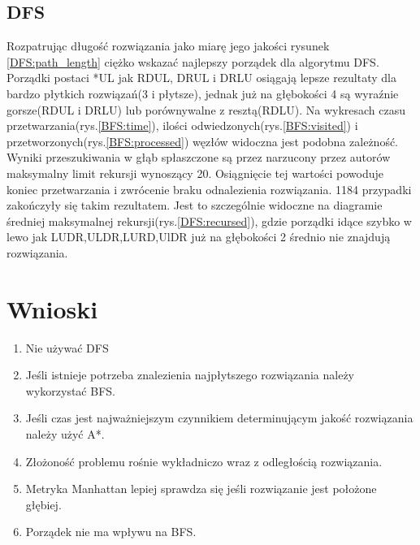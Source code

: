 \documentclass{classrep}
\begin{document}
\subsection{DFS}

Rozpatrując długość rozwiązania jako miarę jego jakości rysunek \ref{DFS:path_length} ciężko wskazać najlepszy porządek dla algorytmu DFS.
Porządki postaci *UL jak RDUL, DRUL i DRLU osiągają lepsze rezultaty dla bardzo płytkich rozwiązań(3 i płytsze), jednak już na głębokości 4 są wyraźnie gorsze(RDUL i DRLU) lub porównywalne z resztą(RDLU).
Na wykresach czasu przetwarzania(rys.\ref{BFS:time}), ilości odwiedzonych(rys.\ref{BFS:visited}) i przetworzonych(rys.\ref{BFS:processed}) węzłów widoczna jest podobna zależność.
Wyniki przeszukiwania w głąb spłaszczone są przez narzucony przez autorów maksymalny limit rekursji wynoszący 20.
Osiągnięcie tej wartości powoduje koniec przetwarzania i zwrócenie braku odnalezienia rozwiązania.
1184 przypadki zakończyły się takim rezultatem.
Jest to szczególnie widoczne na diagramie średniej maksymalnej rekursji(rys.\ref{DFS:recursed}), gdzie porządki idące szybko w lewo jak LUDR,ULDR,LURD,UlDR już na głębokości 2 średnio nie znajdują rozwiązania.

 


\section{Wnioski}
\begin{enumerate}
    \item Nie używać DFS
    \item Jeśli istnieje potrzeba znalezienia najpłytszego rozwiązania należy wykorzystać BFS.
    \item Jeśli czas jest najważniejszym czynnikiem determinującym jakość rozwiązania należy użyć A*.
    \item Złożoność problemu rośnie wykładniczo wraz z odległością rozwiązania.
    \item Metryka Manhattan lepiej sprawdza się jeśli rozwiązanie jest położone głębiej.
    \item Porządek nie ma wpływu na BFS.
\end{enumerate}
\end{document}
